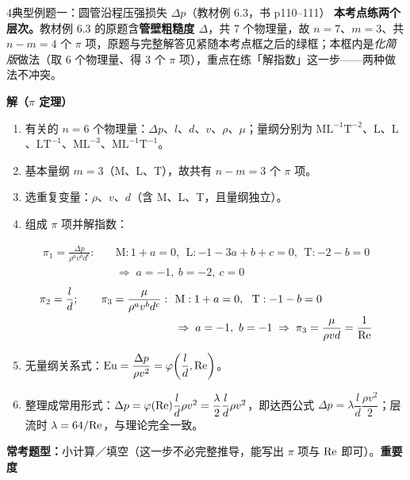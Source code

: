 \begin{kaodian}{4}{典型例题一：圆管沿程压强损失 $\Delta p$（教材例 6.3，书 p110--111）}
\textbf{本考点练两个层次。}教材例 6.3 的原题含\textbf{管壁粗糙度 $\Delta$}，共 7 个物理量，故 $n=7$、$m=3$、共 $n-m=4$ 个 $\pi$ 项，原题与完整解答见紧随本考点框之后的绿框；本框内是\emph{化简版}做法（取 6 个物理量、得 3 个 $\pi$ 项），重点在练「解指数」这一步——两种做法不冲突。

\begin{banfa}
\textbf{解（$\pi$ 定理）}
\begin{enumerate}
\item 有关的 $n=6$ 个物理量：$\Delta p$、$l$、$d$、$v$、$\rho$、$\mu$；量纲分别为 $\mathrm{ML^{-1}T^{-2}}$、$\mathrm{L}$、$\mathrm{L}$、$\mathrm{LT^{-1}}$、$\mathrm{ML^{-3}}$、$\mathrm{ML^{-1}T^{-1}}$。
\item 基本量纲 $m=3$（M、L、T），故共有 $n-m=3$ 个 $\pi$ 项。
\item 选重复变量：$\rho$、$v$、$d$（含 M、L、T，且量纲独立）。
\item 组成 $\pi$ 项并解指数：
\end{enumerate}
\[
\begin{aligned}
\pi_1=\frac{\Delta p}{\rho^{a}v^{b}d^{c}}:\quad & \mathrm{M}:1+a=0,\ \ \mathrm{L}:-1-3a+b+c=0,\ \ \mathrm{T}:-2-b=0\\
& \Rightarrow\; a=-1,\ b=-2,\ c=0
\end{aligned}
\]
\[
\begin{aligned}
\pi_2=\frac{l}{d};\qquad \pi_3=\frac{\mu}{\rho^{a}v^{b}d^{c}}:\ \ & \mathrm{M}:1+a=0,\ \ \mathrm{T}:-1-b=0\\
& \Rightarrow\; a=-1,\ b=-1 \;\Rightarrow\; \pi_3=\frac{\mu}{\rho v d}=\frac{1}{\mathrm{Re}}
\end{aligned}
\]
\begin{enumerate}
\setcounter{enumi}{4}
\item 无量纲关系式：$\mathrm{Eu}=\dfrac{\Delta p}{\rho v^{2}}=\varphi\!\left(\dfrac{l}{d},\mathrm{Re}\right)$。
\item 整理成常用形式：$\Delta p=\varphi(\mathrm{Re})\dfrac{l}{d}\rho v^{2}=\dfrac{\lambda}{2}\dfrac{l}{d}\rho v^{2}$，即达西公式 $\Delta p=\lambda\dfrac{l}{d}\dfrac{\rho v^{2}}{2}$；层流时 $\lambda=64/\mathrm{Re}$，与理论完全一致。
\end{enumerate}
\end{banfa}

\textbf{常考题型：}小计算／填空（这一步不必完整推导，能写出 $\pi$ 项与 $\mathrm{Re}$ 即可）。\quad\textbf{重要度 }\quad{}\quad{}
\end{kaodian}

